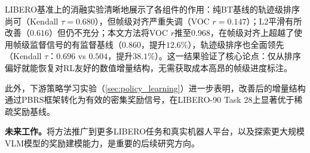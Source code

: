 LIBERO基准上的消融实验清晰地展示了各组件的作用：纯BT基线的轨迹级排序尚可（Kendall $\tau = 0.680$），但帧级对齐严重失调（VOC $r = 0.147$）；L2平滑有所改善（$0.616$）但仍不充分；本文方法将VOC $r$推至$0.968$，在帧级对齐上超越了使用帧级监督信号的有监督基线（$0.860$，提升$12.6\%$），轨迹级排序也全面领先（Kendall $\tau$：$0.696$ vs $0.504$，提升$38.1\%$）。这一结果验证了核心论点：仅从排序偏好就能恢复对RL友好的数值增量结构，无需获取成本高昂的帧级进度标注。

此外，下游策略学习实验（\cref{sec:policy_learning}）进一步表明，改善后的增量结构通过PBRS框架转化为有效的密集奖励信号，在LIBERO-90 Task 28上显著优于稀疏奖励基线。

\textbf{未来工作。}将方法推广到更多LIBERO任务和真实机器人平台，以及探索更大规模VLM模型的奖励建模能力，是重要的后续研究方向。



